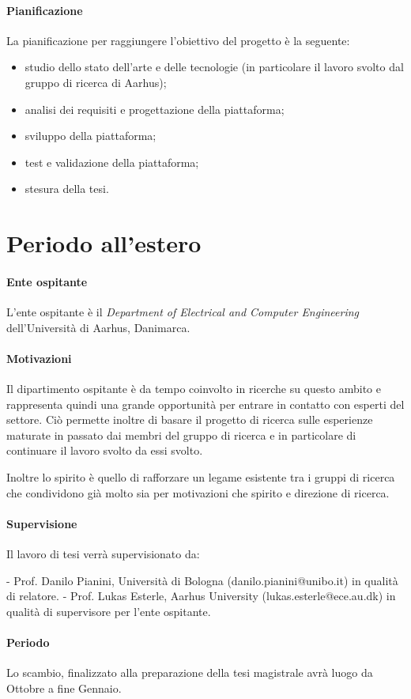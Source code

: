 \documentclass[12pt, a4paper]{article}
\begin{document}
\paragraph{Pianificazione}

La pianificazione per raggiungere l'obiettivo del progetto è la seguente:
\begin{itemize}
    \item studio dello stato dell'arte e delle tecnologie (in particolare il lavoro svolto dal gruppo di ricerca 
    di Aarhus);
    \item analisi dei requisiti e progettazione della piattaforma;
    \item sviluppo della piattaforma;
    \item test e validazione della piattaforma;
    \item stesura della tesi.
\end{itemize}

\section{Periodo all'estero}

\paragraph{Ente ospitante}
L'ente ospitante è il \textit{Department of Electrical and Computer Engineering} dell'Università di Aarhus, Danimarca.

\paragraph{Motivazioni}
Il dipartimento ospitante è da tempo coinvolto in ricerche su questo ambito e rappresenta
quindi una grande opportunità per entrare in contatto con esperti del settore.
Ciò permette inoltre di basare il progetto di ricerca sulle esperienze maturate in passato
dai membri del gruppo di ricerca e in particolare di continuare il lavoro svolto da essi svolto.

Inoltre lo spirito è quello di rafforzare un legame esistente tra i gruppi di ricerca che
condividono già molto sia per motivazioni che spirito e direzione di ricerca.

\paragraph{Supervisione}
Il lavoro di tesi verrà supervisionato da:

- Prof. Danilo Pianini, Università di Bologna (danilo.pianini@unibo.it) in qualità di relatore.
- Prof. Lukas Esterle, Aarhus University (lukas.esterle@ece.au.dk) in qualità di supervisore per l'ente ospitante.

\paragraph{Periodo}
Lo scambio, finalizzato alla preparazione della tesi magistrale avrà luogo da Ottobre a fine Gennaio.
\end{document}
